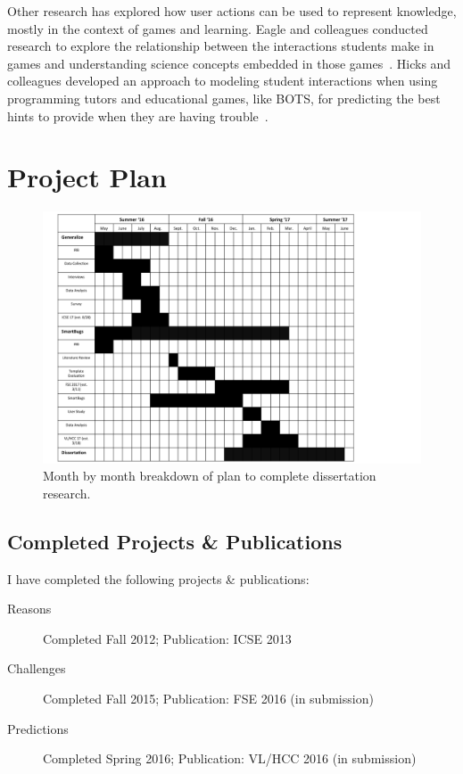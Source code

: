 \documentclass{llncs}
\begin{document}
Other research has explored how user actions can be used to represent knowledge, mostly in the context of games and learning. Eagle and colleagues conducted research to explore the relationship between the interactions students make in games and understanding science concepts embedded in those games~\cite{eagle2015measuring}. Hicks and colleagues developed an approach to modeling student interactions when using programming tutors and educational games, like BOTS, for predicting the best hints to provide when they are having trouble~\cite{hicks2014building}.



\section{Project Plan}

\begin{figure} 
	\centering
	\includegraphics[width=5in]{figs/project-schedule.pdf}
	\caption{Month by month breakdown of plan to complete dissertation research.}
	\label{fig:plan}
\end{figure}

\subsection{Completed Projects \& Publications}

I have completed the following projects \& publications:
\begin{description}
	\item[Reasons] Completed Fall 2012; Publication: ICSE 2013
	\item[Challenges] Completed Fall 2015; Publication: FSE 2016 (in submission)
	\item[Predictions] Completed Spring 2016; Publication: VL/HCC 2016 (in submission)
\end{description}
\end{document}
